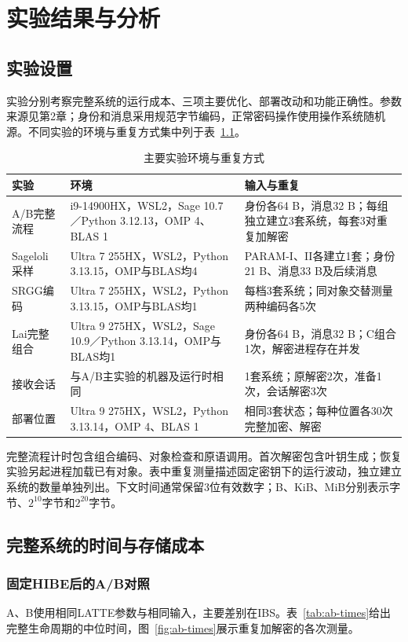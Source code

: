 \chapter{实验结果与分析}

\section{实验设置}
实验分别考察完整系统的运行成本、三项主要优化、部署改动和功能正确性。参数来源见第2章；身份和消息采用规范字节编码，正常密码操作使用操作系统随机源。不同实验的环境与重复方式集中列于表~\ref{tab:environments}。

\begin{table}[H]
\centering\small
\caption{主要实验环境与重复方式}
\label{tab:environments}
\begin{tabularx}{\textwidth}{@{}p{}Xp{}@{}}
\toprule
\rowcolor{black!8} 实验 & 环境 & 输入与重复 \\
\midrule
A/B完整流程 & i9-14900HX，WSL2，Sage 10.7／Python 3.12.13，OMP 4、BLAS 1 & 身份各64 B，消息32 B；每组独立建立3套系统，每套3对重复加解密 \\
Sageloli采样 & Ultra 7 255HX，WSL2，Python 3.13.15，OMP与BLAS均4 & PARAM-I、II各建立1套；身份21 B、消息33 B及后续消息 \\
SRGG编码 & Ultra 7 255HX，WSL2，Python 3.13.15，OMP与BLAS均1 & 每档3套系统；同对象交替测量两种编码各5次 \\
Lai完整组合 & Ultra 9 275HX，WSL2，Sage 10.9／Python 3.13.14，OMP与BLAS均1 & 身份各64 B，消息32 B；C组合1次，解密进程存在并发 \\
接收会话 & 与A/B主实验的机器及运行时相同 & 1套系统；原解密2次，准备1次，会话解密3次 \\
部署位置 & Ultra 9 275HX，WSL2，Python 3.13.14，OMP 4、BLAS 1 & 相同3套状态；每种位置各30次完整加密、解密 \\
\bottomrule
\end{tabularx}
\end{table}

完整流程计时包含组合编码、对象检查和原语调用。首次解密包含叶钥生成；恢复实验另起进程加载已有对象。表中重复测量描述固定密钥下的运行波动，独立建立系统的数量单独列出。下文时间通常保留3位有效数字；B、KiB、MiB分别表示字节、$2^{10}$字节和$2^{20}$字节。

\section{完整系统的时间与存储成本}
\subsection{固定HIBE后的A/B对照}
A、B使用相同LATTE参数与相同输入，主要差别在IBS。表~\ref{tab:ab-times}给出完整生命周期的中位时间，图~\ref{fig:ab-times}展示重复加解密的各次测量。

